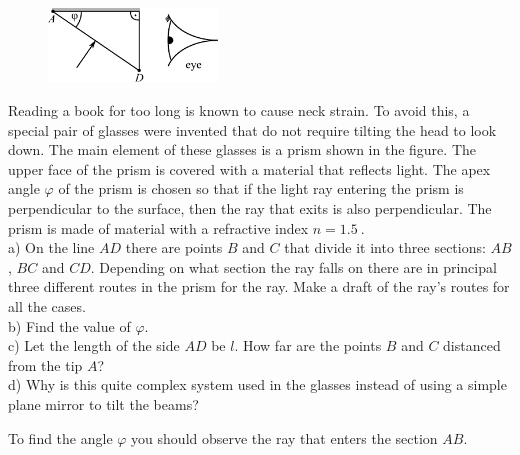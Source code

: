 {\ifEngStatement
\begin{figure}
  \begin{center}
    \includegraphics[width=0.4\textwidth]{2014-v3g-04-periskoopprillid_yl_joonis_ing}
  \end{center}
\end{figure}
Reading a book for too long is known to cause neck strain. To avoid this, a special pair of glasses were invented that do not require tilting the head to look down. The main element of these glasses is a prism shown in the figure. The upper face of the prism is covered with a material that reflects light. The apex angle $\varphi$ of the prism is chosen so that if the light ray entering the prism is perpendicular to the surface, then the ray that exits is also perpendicular. The prism is made of material with a refractive index $n=\SI{1,5}{}$.\\
a) On the line $AD$ there are points $B$ and $C$ that divide it into three sections: $AB$, $BC$ and $CD$. Depending on what section the ray falls on there are in principal three different routes in the prism for the ray. Make a draft of the ray’s routes for all the cases. \\
b) Find the value of $\varphi$.\\
c) Let the length of the side $AD$ be $l$. How far are the points $B$ and $C$ distanced from the tip $A$?\\
d) Why is this quite complex system used in the glasses instead of using a simple plane mirror to tilt the beams?
\fi


\ifEngHint
To find the angle $\varphi$ you should observe the ray that enters the section $AB$.
\fi


}
